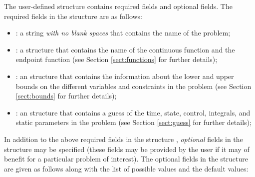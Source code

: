 \documentclass[10pt]{article}
\newcommand{\bfblue}[1]{\textrm{{\color{blue}{\bf #1}}}}
\newcommand{\slred}[1]{\textrm{\color{red}{\sl #1}}}
\begin{document}
The user-defined structure \slred{setup} contains required fields and
optional fields.  The required fields in the structure \slred{input}
are as follows: 
\begin{itemize}
\item \bfblue{name}:  a string {\em with no blank spaces} that
  contains the name of the problem;  
\item \bfblue{functions}:  a structure that contains the name of the
  continuous function and the endpoint function (see Section
  \ref{sect:functions} for further details); 
\item \bfblue{bounds}:  an structure that contains the information
  about the lower and upper bounds on the different variables and 
  constraints in the problem (see Section \ref{sect:bounds} for further
  details); 
\item \bfblue{guess}:  an structure that contains a guess of the
  time, state, control, integrals, and static parameters in the
  problem (see Section \ref{sect:guess} for further details); 
\end{itemize}
In addition to the above required fields in the structure
\slred{setup}, {\em optional} fields in the \slred{setup} structure
may be specified (these fields may be provided by the user if it may
of benefit for a particular problem of interest). The optional fields
in the structure \slred{setup} are given as follows along with the
list of possible values and the default values:
\end{document}
